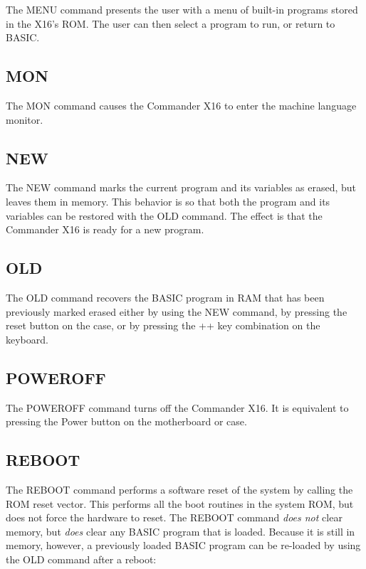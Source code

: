 The {\ttfamily MENU} command presents the user with a menu of built-in programs
stored in the X16's ROM.  The user can then select a program to run, or return
to BASIC.\\

\subsection{MON}

The {\ttfamily MON} command causes the Commander X16 to enter the machine
language monitor.\\

\subsection{NEW} 

The {\ttfamily NEW} command marks the current program and its variables as
erased, but leaves them in memory.  This behavior is so that both the program
and its variables can be restored with the {\ttfamily OLD} command.  The effect
is that the Commander X16 is ready for a new program.\\

\subsection{OLD}

 The {\ttfamily OLD} command recovers the BASIC program in RAM that has been
 previously marked erased either by using the {\ttfamily NEW} command, by
 pressing the reset button on the case, or by pressing the
 ++
 key combination on the keyboard.\\

\subsection{POWEROFF}

The {\ttfamily POWEROFF} command turns off the Commander X16.  It is equivalent
to pressing the Power button on the motherboard or case.\\

\subsection{REBOOT}

The {\ttfamily REBOOT} command performs a software reset of the system by
calling the ROM reset vector.  This performs all the boot routines in the
system ROM, but does not force the hardware to reset.  The {\ttfamily REBOOT}
command {\em does not} clear memory, but {\em does} clear any BASIC program
that is loaded.  Because it is still in memory, however, a previously loaded
BASIC program can be re-loaded by using the {\ttfamily OLD} command after a
reboot:\\

